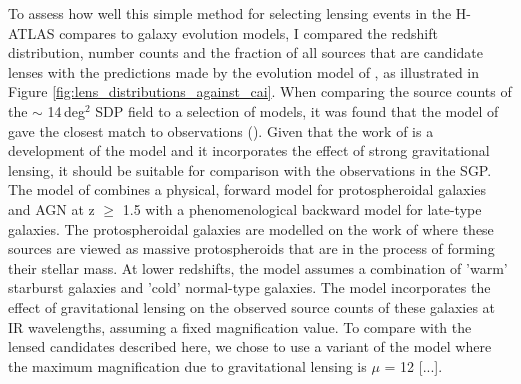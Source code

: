 To assess how well this simple method for selecting lensing events in the H-ATLAS compares to galaxy evolution models, I compared the redshift distribution, number counts and the fraction of all sources that are candidate lenses with the predictions made by the evolution model of \citealt{Cai_2013}, as illustrated in Figure \ref{fig:lens_distributions_against_cai}. When comparing the source counts of the $\sim$ 14\,deg$^{2}$ SDP field to a selection of models, it was found that the model of \citealt{Negrello_2007} gave the closest match to observations (\citealt{Clements_2010}). Given that the work of \citealt{Cai_2013} is a development of the \citealt{Negrello_2007} model and it incorporates the effect of strong gravitational lensing, it should be suitable for comparison with the observations in the SGP. The model of \citealt{Cai_2013} combines a physical, forward model for protospheroidal galaxies and AGN at z $\geq$ 1.5 with a phenomenological backward model for late-type galaxies. The protospheroidal galaxies are modelled on the work of \citealt{Granato_2004} where these sources are viewed as massive protospheroids that are in the process of forming their stellar mass. At lower redshifts, the model assumes a combination of 'warm' starburst galaxies and 'cold' normal-type galaxies. The model incorporates the effect of gravitational lensing on the observed source counts of these galaxies at IR wavelengths, assuming a fixed magnification value. To compare with the lensed candidates described here, we chose to use a variant of the \citealt{Cai_2013} model where the maximum magnification due to gravitational lensing is $\mu$ = 12 [...].

